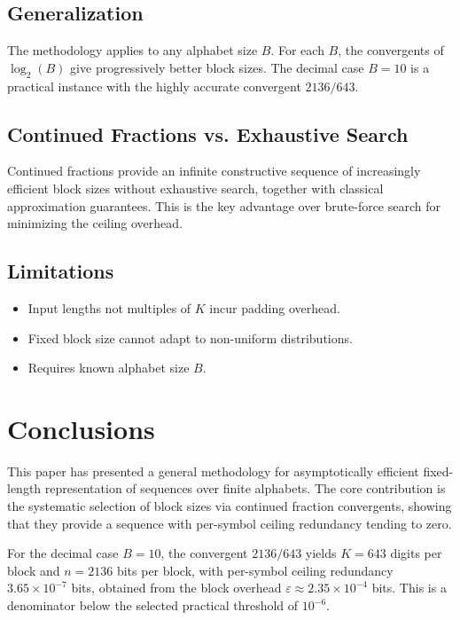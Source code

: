 \documentclass[10pt, onecolumn]{IEEEtran}
\begin{document}
\subsection{Generalization}

The methodology applies to any alphabet size $B$. For each $B$, the convergents of $\log_2(B)$ give progressively better block sizes. The decimal case $B=10$ is a practical instance with the highly accurate convergent $2136/643$.

\subsection{Continued Fractions vs. Exhaustive Search}

Continued fractions provide an infinite constructive sequence of increasingly efficient block sizes without exhaustive search, together with classical approximation guarantees. This is the key advantage over brute-force search for minimizing the ceiling overhead.

\subsection{Limitations}

\begin{itemize}
    \item Input lengths not multiples of $K$ incur padding overhead.
    \item Fixed block size cannot adapt to non-uniform distributions.
    \item Requires known alphabet size $B$.
\end{itemize}

\section{Conclusions}

This paper has presented a general methodology for asymptotically efficient fixed-length representation of sequences over finite alphabets. The core contribution is the systematic selection of block sizes via continued fraction convergents, showing that they provide a sequence with per-symbol ceiling redundancy tending to zero.

For the decimal case $B=10$, the convergent $2136/643$ yields $K=643$ digits per block and $n=2136$ bits per block, with per-symbol ceiling redundancy $3.65\times10^{-7}$ bits, obtained from the block overhead $\varepsilon \approx 2.35\times10^{-4}$ bits. This is a denominator below the selected practical threshold of $10^{-6}$.
\end{document}
